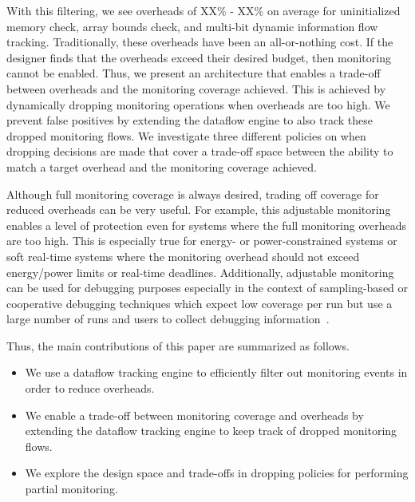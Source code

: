 With this filtering, we see overheads of XX\% - XX\% on average for
uninitialized memory check, array bounds check, and multi-bit dynamic
information flow tracking. 
Traditionally, these overheads have been an all-or-nothing cost. If the
designer finds that the overheads exceed their desired budget, then monitoring
cannot be enabled.  
Thus, we present an architecture that enables a trade-off between overheads and
the monitoring coverage achieved. This is achieved by dynamically dropping
monitoring operations when overheads are too high. We prevent false
positives by extending the dataflow engine to also track these dropped
monitoring flows. We investigate three different policies on when dropping decisions are
made that cover a trade-off space between the ability to match a target overhead
and the monitoring coverage achieved.

Although full monitoring coverage is always desired, trading off coverage for
reduced overheads can be very useful. For example, this adjustable
monitoring enables a level of protection even for systems where the full
monitoring overheads are too high. This is especially true for energy- or
power-constrained systems or soft real-time systems where the monitoring
overhead should not exceed energy/power limits or real-time deadlines.
Additionally, adjustable monitoring can be used for debugging purposes
especially in the context of sampling-based or cooperative debugging techniques
which expect low coverage per run but use a large number of runs and users to
collect debugging information~\cite{liblit-pldi05, chilimbi-asplos04,
greathouse-cgo11}. 

Thus, the main contributions of this paper are summarized as follows.
\begin{itemize}
  \item We use a dataflow tracking engine to efficiently filter out monitoring events in order to reduce overheads.
  \item We enable a trade-off between monitoring coverage and overheads by extending the dataflow tracking engine to keep track of dropped monitoring flows.
  \item We explore the design space and trade-offs in dropping policies for performing partial monitoring.
\end{itemize}

